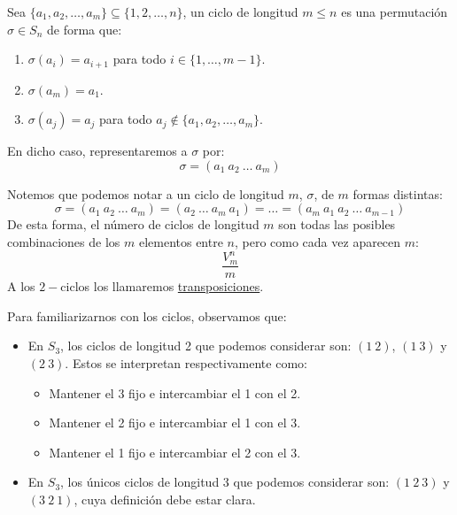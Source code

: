 \begin{definicion}[Ciclo]
    Sea $\{a_1,a_2,\ldots,a_m\}\subseteq \{1,2,\ldots,n\}$, un ciclo de longitud $m\leq n$ es una permutación $\sigma\in S_n$ de forma que:
    \begin{enumerate}
        \item $\sigma(a_i) = a_{i+1}$ para todo $i \in \{1,\ldots,m-1\}$.
        \item $\sigma(a_m) = a_1$.
        \item $\sigma(a_j) = a_j$ para todo $a_j \notin \{a_1,a_2,\ldots,a_m\}$.
    \end{enumerate}
    En dicho caso, representaremos a $\sigma$ por:
    \begin{equation*}
        \sigma = (a_1\ a_2\ \ldots\ a_m)
    \end{equation*}
\end{definicion}

\begin{observacion}
    Notemos que podemos notar a un ciclo de longitud $m$, $\sigma$, de $m$ formas distintas:
    \begin{equation*}
        \sigma = (a_1\ a_2\ \ldots\ a_m) = (a_2\ \ldots\ a_m\ a_1) = \ldots = (a_m\ a_1\ a_2\ \ldots\ a_{m-1})
    \end{equation*}
    De esta forma, el número de ciclos de longitud $m$ son todas las posibles combinaciones de los $m$ elementos entre $n$, pero como cada vez aparecen $m$:
    \begin{equation*}
        \dfrac{V_m^n}{m}
    \end{equation*}
    A los $2-$ciclos los llamaremos \underline{transposiciones}.
\end{observacion}

\begin{ejemplo}
    Para familiarizarnos con los ciclos, observamos que:
    \begin{itemize}
        \item En $S_3$, los ciclos de longitud 2 que podemos considerar son: $(1\ 2)$, $(1\ 3)$ y $(2\ 3)$. Estos se interpretan respectivamente como:
            \begin{itemize}
                \item Mantener el 3 fijo e intercambiar el 1 con el 2.
                \item Mantener el 2 fijo e intercambiar el 1 con el 3.
                \item Mantener el 1 fijo e intercambiar el 2 con el 3.
            \end{itemize}
        \item En $S_3$, los únicos ciclos de longitud 3 que podemos considerar son: $(1\ 2\ 3)$ y $(3\ 2\ 1)$, cuya definición debe estar clara.
    \end{itemize}
\end{ejemplo}

